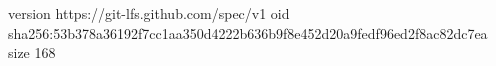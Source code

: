 version https://git-lfs.github.com/spec/v1
oid sha256:53b378a36192f7cc1aa350d4222b636b9f8e452d20a9fedf96ed2f8ac82dc7ea
size 168
